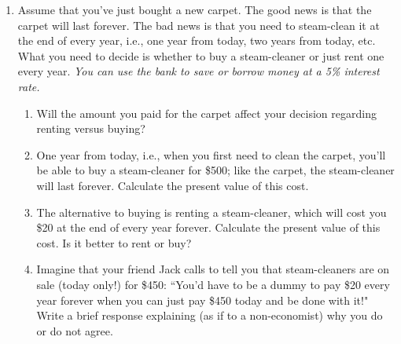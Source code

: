 \begin{enumerate}
\item Assume that you've just bought a new carpet. The good news is that the carpet will last forever. The bad news is that you need to steam-clean it at the end of every year, i.e., one year from today, two years from today, etc. What you need to decide is whether to buy a steam-cleaner or just rent one every year. \emph{You can use the bank to save or borrow money at a 5\% interest rate.}

    \begin{enumerate}

    \item Will the amount you paid for the carpet affect your decision regarding renting versus buying?


    \item One year from today, i.e., when you first need to clean the carpet, you'll be able to buy a steam-cleaner for \$500; like the carpet, the steam-cleaner will last forever. Calculate the present value of this cost.


    \item The alternative to buying is renting a steam-cleaner, which will cost you \$20 at the end of every year forever. Calculate the present value of this cost. Is it better to rent or buy?

    \item Imagine that your friend Jack calls to tell you that steam-cleaners are on sale (today only!) for \$450: ``You'd have to be a dummy to pay \$20 every year forever when you can just pay \$450 today and be done with it!" Write a brief response explaining (as if to a non-economist) why you do or do not agree.

    \end{enumerate}



\end{enumerate}











